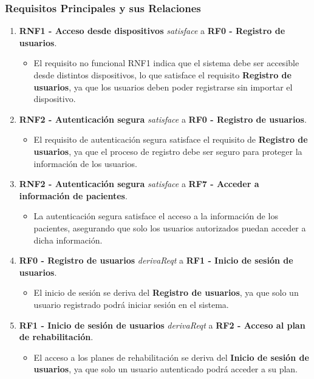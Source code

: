 \documentclass{article}
\begin{document}
\subsubsection{Requisitos Principales y sus Relaciones}
\begin{enumerate}
	\item \textbf{RNF1 - Acceso desde dispositivos} \textit{satisface} a \textbf{RF0 - Registro de usuarios}.
	\begin{itemize}
		\item El requisito no funcional RNF1 indica que el sistema debe ser accesible desde distintos dispositivos, lo que satisface el requisito \textbf{Registro de usuarios}, ya que los usuarios deben poder registrarse sin importar el dispositivo.
	\end{itemize}
	
	\item \textbf{RNF2 - Autenticación segura} \textit{satisface} a \textbf{RF0 - Registro de usuarios}.
	\begin{itemize}
		\item El requisito de autenticación segura satisface el requisito de \textbf{Registro de usuarios}, ya que el proceso de registro debe ser seguro para proteger la información de los usuarios.
	\end{itemize}
	
	\item \textbf{RNF2 - Autenticación segura} \textit{satisface} a \textbf{RF7 - Acceder a información de pacientes}.
	\begin{itemize}
		\item La autenticación segura satisface el acceso a la información de los pacientes, asegurando que solo los usuarios autorizados puedan acceder a dicha información.
	\end{itemize}
	
	\item \textbf{RF0 - Registro de usuarios} \textit{derivaReqt} a \textbf{RF1 - Inicio de sesión de usuarios}.
	\begin{itemize}
		\item El inicio de sesión se deriva del \textbf{Registro de usuarios}, ya que solo un usuario registrado podrá iniciar sesión en el sistema.
	\end{itemize}
	
	\item \textbf{RF1 - Inicio de sesión de usuarios} \textit{derivaReqt} a \textbf{RF2 - Acceso al plan de rehabilitación}.
	\begin{itemize}
		\item El acceso a los planes de rehabilitación se deriva del \textbf{Inicio de sesión de usuarios}, ya que solo un usuario autenticado podrá acceder a su plan.
	\end{itemize}
	

\end{enumerate}
\end{document}
